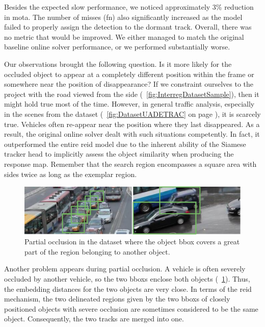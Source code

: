 Besides the expected slow performance, we noticed approximately $3$\% reduction in \gls{mota}. The number of misses (\gls{fn}) also significantly increased as the model failed to properly assign the detection to the dormant track. Overall, there was no metric that would be improved. We either managed to match the original baseline online solver performance, or we performed substantially worse.

Our observations brought the following question. Is it more likely for the occluded object to appear at a completely different position within the frame or somewhere near the position of disappearance? If we constraint ourselves to the \interreg{} project with the road viewed from the side (\figtext{}~\ref{fig:InterregDatasetSample}), then it might hold true most of the time. However, in general traffic analysis, especially in the scenes from the \uadetrac{} dataset (\figtext{}~\ref{fig:DatasetUADETRAC} on page \pageref{fig:DatasetUADETRAC}), it is scarcely true. Vehicles often re-appear near the position where they last disappeared. As a result, the original online solver dealt with such situations competently. In fact, it outperformed the entire \gls{reid} model due to the inherent ability of the Siamese tracker head to implicitly assess the object similarity when producing the response map. Remember that the search region encompasses a square area with sides twice as long as the exemplar region.

\begin{figure}[!t]
    \centering
    \includegraphics[width=\linewidth]{figures/siamese_tracking/uadetrac_partial_occlusion_multiple_cars.pdf}
    \caption[Partial occlusion in \uadetrac{} dataset]{Partial occlusion in the \uadetrac{} dataset where the object \gls{bbox} covers a great part of the region belonging to another object.}
    \label{fig:UADETRACPartialOcclusionMultiple}
\end{figure}

Another problem appears during partial occlusion. A vehicle is often severely occluded by another vehicle, so the two \glspl{bbox} enclose both objects (\figtext{}~\ref{fig:UADETRACPartialOcclusionMultiple}). Thus, the embedding distances for the two objects are very close. In terms of the \gls{reid} mechanism, the two delineated regions given by the two \glspl{bbox} of closely positioned objects with severe occlusion are sometimes considered to be the same object. Consequently, the two tracks are merged into one.

